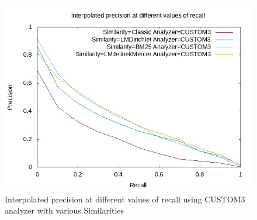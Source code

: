 \vspace*{-4mm}
\begin{figure}[!htbp]
  \centering
  \includegraphics[width=\linewidth]{images/pr_cus3.jpg}
  \vspace*{-3mm}
  \caption{Interpolated precision at different values of recall using CUSTOM3 analyzer with various Similarities}
  \label{fig:exp4}
\end{figure}
